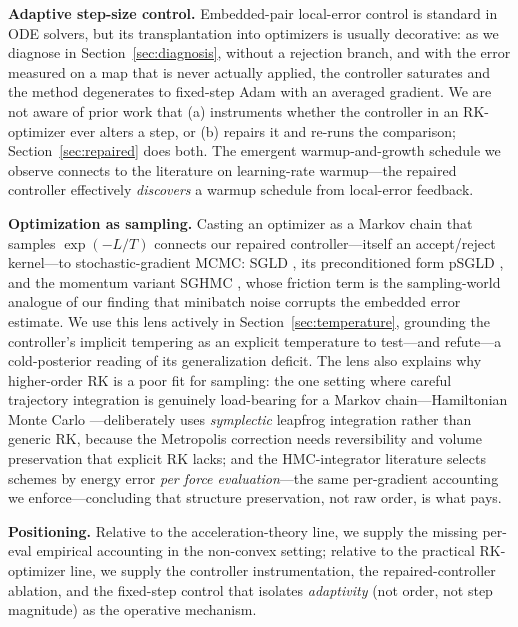 \documentclass{article}
\begin{document}
\textbf{Adaptive step-size control.} Embedded-pair local-error control \cite{bogacki1989pair,dormand1980family,hairer1993solving} is standard in ODE solvers, but its transplantation into optimizers is usually decorative: as we diagnose in Section~\ref{sec:diagnosis}, without a rejection branch, and with the error measured on a map that is never actually applied, the controller saturates and the method degenerates to fixed-step Adam with an averaged gradient. We are not aware of prior work that (a) instruments whether the controller in an RK-optimizer ever alters a step, or (b) repairs it and re-runs the comparison; Section~\ref{sec:repaired} does both. The emergent warmup-and-growth schedule we observe connects to the literature on learning-rate warmup---the repaired controller effectively \emph{discovers} a warmup schedule from local-error feedback.

\textbf{Optimization as sampling.} Casting an optimizer as a Markov chain that samples $\exp(-L/T)$ connects our repaired controller---itself an accept/reject kernel---to stochastic-gradient MCMC: SGLD \cite{welling2011bayesian}, its preconditioned form pSGLD \cite{li2016preconditioned}, and the momentum variant SGHMC \cite{chen2014stochastic}, whose friction term is the sampling-world analogue of our finding that minibatch noise corrupts the embedded error estimate. We use this lens actively in Section~\ref{sec:temperature}, grounding the controller's implicit tempering as an explicit temperature to test---and refute---a cold-posterior \cite{wenzel2020good} reading of its generalization deficit. The lens also explains why higher-order RK is a poor fit for sampling: the one setting where careful trajectory integration is genuinely load-bearing for a Markov chain---Hamiltonian Monte Carlo \cite{neal2011mcmc}---deliberately uses \emph{symplectic} leapfrog integration rather than generic RK, because the Metropolis correction needs reversibility and volume preservation that explicit RK lacks; and the HMC-integrator literature \cite{blanes2014numerical} selects schemes by energy error \emph{per force evaluation}---the same per-gradient accounting we enforce---concluding that structure preservation, not raw order, is what pays.

\textbf{Positioning.} Relative to the acceleration-theory line, we supply the missing per-eval empirical accounting in the non-convex setting; relative to the practical RK-optimizer line, we supply the controller instrumentation, the repaired-controller ablation, and the fixed-step control that isolates \emph{adaptivity} (not order, not step magnitude) as the operative mechanism.
\end{document}
